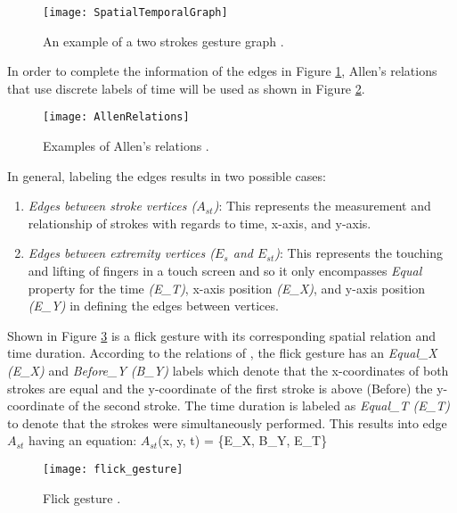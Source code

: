 \begin{figure}[H]
	\centering
	\texttt{[image: SpatialTemporalGraph]}
    \caption{An example of a two strokes gesture graph \citep{chen2014agraph}.}
    \label{fig:spatial-temporal-graph}
\end{figure}

In order to complete the information of the edges in Figure \ref{fig:spatial-temporal-graph}, Allen's relations that use discrete labels of time will be used as shown in Figure \ref{fig:allen-relations}.

\begin{figure}[H]
	\centering
	\texttt{[image: AllenRelations]}
    \caption{Examples of Allen's relations \citep{allen1983maintaining, chen2014agraph}.}
    \label{fig:allen-relations}
\end{figure}

In general, labeling the edges results in two possible cases:

\begin{enumerate}
\item \textit{Edges between stroke vertices ($A_{st}$)}: This represents the measurement and relationship of strokes with regards to time, x-axis, and y-axis. 
\item \textit{Edges between extremity vertices ($E_s$ and $E_{st}$)}: This represents the touching and lifting of fingers in a touch screen and so it only encompasses \textit{Equal} property for the time \textit{(E\_T)}, x-axis position \textit{(E\_X)}, and y-axis position \textit{(E\_Y)} in defining the edges between vertices.
\end{enumerate}


Shown in Figure \ref{fig:flick} is a flick gesture with its corresponding spatial relation and time duration. According to the relations of \citet{allen1983maintaining}, the flick gesture has an \textit{Equal\_X (E\_X)} and \textit{Before\_Y (B\_Y)} labels which denote that the x-coordinates of both strokes are equal and the y-coordinate of the first stroke is above (Before) the y-coordinate of the second stroke. The time duration is labeled as \textit{Equal\_T (E\_T)} to denote that the strokes were simultaneously performed. This results into edge \textit{$A_{st}$} having an equation: $A_{st}$(x, y, t) = \{E\_X, B\_Y, E\_T\}

\begin{figure}[H]
	\centering
	\texttt{[image: flick\_gesture]}
    \caption{Flick gesture \citep{chen2014agraph}.}
    \label{fig:flick}
\end{figure}

